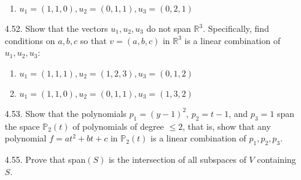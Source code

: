 \documentclass[12pt]{article}
\begin{document}
\begin{enumerate}
\begin{enumerate}
	\item $u_1=(1,1,0),u_2=(0,1,1),u_3=(0,2,1)$
	\end{enumerate}
	
\item[4.52.] Show that the vectors $u_1,u_2,u_3$ do not span $\mathbb{R}^3$. Specifically, find conditions on $a,b,c$ so that $v=(a,b,c)$ in $\mathbb{R}^3$ is a linear combination of $u_1,u_2,u_3$:
	\begin{enumerate}
	\item $u_1=(1,1,1),u_2=(1,2,3),u_3=(0,1,2)$
	
	\item $u_1=(1,1,0),u_2=(0,1,1),u_3=(1,3,2)$
	\end{enumerate}

\item[4.53.] Show that the polynomials $p_1=(y-1)^2$, $p_2=t-1$, and $p_3=1$ span the space $\mathbb{P}_2(t)$ of polynomials of degree $\leq 2$, that is, show that any polynomial $f=at^2+bt+c$ in $\mathbb{P}_2(t)$ is a linear combination of $p_1,p_2,p_3$.

\item[4.55.] Prove that span$(S)$ is the intersection of all subspaces of $V$ containing $S$.


\end{enumerate}
\end{document}
